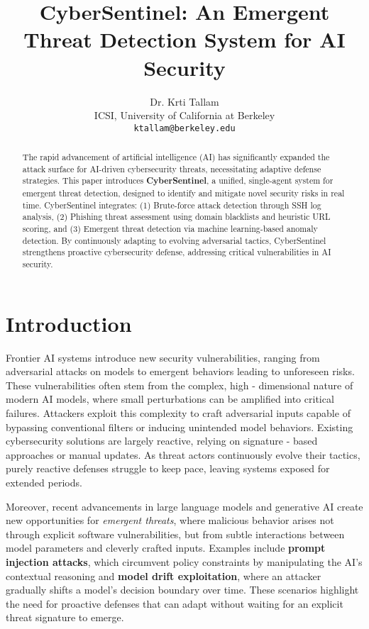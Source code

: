 \documentclass{article}
\title{CyberSentinel: An Emergent Threat Detection System for AI Security}
\author{
  Dr. Krti Tallam \\
  ICSI, University of California at Berkeley \\
  \texttt{ktallam@berkeley.edu}
}
\begin{document}
\maketitle

\begin{abstract}
The rapid advancement of artificial intelligence (AI) has significantly expanded the attack surface for AI-driven cybersecurity threats, necessitating adaptive defense strategies. This paper introduces \textbf{CyberSentinel}, a unified, single-agent system for emergent threat detection, designed to identify and mitigate novel security risks in real time. CyberSentinel integrates: (1) Brute-force attack detection through SSH log analysis, (2) Phishing threat assessment using domain blacklists and heuristic URL scoring, and (3) Emergent threat detection via machine learning-based anomaly detection. By continuously adapting to evolving adversarial tactics, CyberSentinel strengthens proactive cybersecurity defense, addressing critical vulnerabilities in AI security.
\end{abstract}

\section{Introduction}
Frontier AI systems introduce new security vulnerabilities, ranging from adversarial attacks on models \cite{carlini2017towards, papernot2016limitations} to emergent behaviors leading to unforeseen risks. These vulnerabilities often stem from the complex, high - dimensional nature of modern AI models, where small perturbations can be amplified into critical failures. Attackers exploit this complexity to craft adversarial inputs capable of bypassing conventional filters or inducing unintended model behaviors. Existing cybersecurity solutions are largely reactive, relying on signature - based approaches or manual updates. As threat actors continuously evolve their tactics, purely reactive defenses struggle to keep pace, leaving systems exposed for extended periods.

Moreover, recent advancements in large language models and generative AI create new opportunities for \textit{emergent threats}, where malicious behavior arises not through explicit software vulnerabilities, but from subtle interactions between model parameters and cleverly crafted inputs. Examples include \textbf{prompt injection attacks}, which circumvent policy constraints by manipulating the AI’s contextual reasoning and \textbf{model drift exploitation}, where an attacker gradually shifts a model’s decision boundary over time. These scenarios highlight the need for proactive defenses that can adapt without waiting for an explicit threat signature to emerge.
\end{document}
